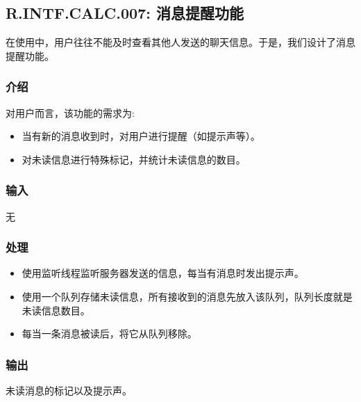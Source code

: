 \subsection{R.INTF.CALC.007: 消息提醒功能}
在使用中，用户往往不能及时查看其他人发送的聊天信息。于是，我们设计了消息提醒功能。
\subsubsection{介绍}
对用户而言，该功能的需求为:
\begin{itemize}
  \item 当有新的消息收到时，对用户进行提醒（如提示声等）。
  \item 对未读信息进行特殊标记，并统计未读信息的数目。
\end{itemize}
\subsubsection{输入}
无
\subsubsection{处理}
\begin{itemize}
  \item 使用监听线程监听服务器发送的信息，每当有消息时发出提示声。
  \item 使用一个队列存储未读信息，所有接收到的消息先放入该队列，队列长度就是未读信息数目。
  \item 每当一条消息被读后，将它从队列移除。
\end{itemize}
\subsubsection{输出}
未读消息的标记以及提示声。